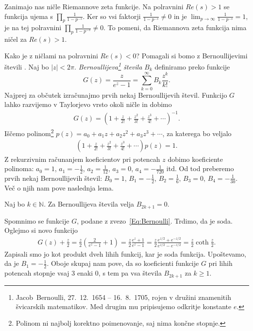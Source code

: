 \documentclass[mat1]{fmfdelo}
\begin{document}
Zanimajo nas ničle Riemannove zeta funkcije. Na polravnini $Re(s)>1$ se funkcija ujema s $\prod_{p}\frac{1}{1-p^{-s}}$. Ker so vsi faktorji $\frac{1}{1-p^{-s}} \neq 0$ in je $\lim_{p\to\infty} \frac{1}{1-p^{-s}} = 1$, je na tej polravnini $\prod_{p}\frac{1}{1-p^{-s}} \neq 0$. To pomeni, da Riemannova zeta funkcija nima ničel za $Re(s)>1$.

Kako je z ničlami na polravnini $Re(s)<0$?
Pomagali si bomo z Bernoullijevimi števili \cite[poglavje 3]{bernoulli}. Naj bo $|z|<2\pi$. \emph{Bernoullijeva\footnote{Jacob~Bernoulli, 27.\ 12.\ 1654 -- 16.\ 8.\ 1705, rojen v družini znamenitih švicarskih matematikov. Med drugim mu pripisujemo odkritje konstante $e$.} števila} $B_{k}$ definiramo preko funkcije
\begin{equation}
\label{Eq:Bernoulli}
G(z) = \frac{z}{e^z-1} = \sum_{k=0}^{\infty} B_{k} \frac{z^k}{k!}.
\end{equation}
%
Najprej za občutek izračunajmo prvih nekaj Bernoullijevih števil. Funkcijo $G$ lahko razvijemo v Taylorjevo vrsto okoli ničle in dobimo
\begin{align*}
G(z) = \left(1 + \frac{z}{2!} + \frac{z^2}{3!} + \frac{z^3}{4!} + \cdots \right)^{-1}.
\end{align*}
%
Iščemo polinom\footnote{Polinom ni najbolj korektno poimenovanje, saj nima končne stopnje.} $p(z) = a_{0}+a_{1}z+a_{2}z^2+a_{3}z^3+\cdots$, za katerega bo veljalo
\begin{align*}
\left(1 + \frac{z}{2!} + \frac{z^2}{3!} + \frac{z^3}{4!} + \cdots \right) p(z) = 1.
\end{align*}
%
Z rekurzivnim računanjem koeficientov pri potencah $z$ dobimo koeficiente polinoma: $a_{0}=1$, $a_{1}=-\frac{1}{2}$, $a_{2}=\frac{1}{12}$, $a_{3}=0$, $a_{4}=-\frac{1}{720}$ itd. Od tod preberemo prvih nekaj Bernoullijevih števil: $B_{0} = 1$, $B_{1} = -\frac{1}{2}$,  $B_{2} = \frac{1}{6}$,  $B_{3} = 0$, $B_{4} = -\frac{1}{30}$.
Več o njih nam pove naslednja lema.

\begin{lema}
Naj bo $k \in \mathbb{N}$. Za Bernoullijeva števila velja $B_{2k+1}=0$.
\end{lema}

\begin{dokaz}
Spomnimo se funkcije $G$, podane z zvezo~\eqref{Eq:Bernoulli}. Trdimo, da je soda. Oglejmo si novo funkcijo
\begin{align}
G(z) + \frac{z}{2} = \frac{z}{2} \left( \frac{2}{e^{z}-1}+1 \right) = \frac{z}{2} \frac{e^{z}+1}{e^{z}-1} 
	= \frac{z}{2} \frac{e^{z/2}+e^{-z/2}}{e^{z/2}-e^{-z/2}} = \frac{z}{2} \coth{\frac{z}{2}}.
\end{align}
%
Zapisali smo jo kot produkt dveh lihih funkcij, kar je soda funkcija. Upoštevamo, da je $B_{1}=-\frac{1}{2}$. Oboje skupaj nam pove, da so koeficienti funkcije $G$ pri lihih potencah stopnje vsaj $3$ enaki $0$, s tem pa vsa števila $B_{2k+1}$ za $k \geq 1$.
\end{dokaz}
\end{document}
